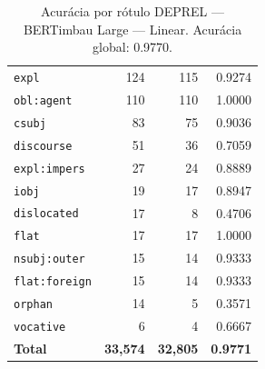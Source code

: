 \begin{table}[ht]
\begin{tabular}{lrrr}
\texttt{expl} & 124 & 115 & 0.9274 \\
\texttt{obl\!:\!agent} & 110 & 110 & 1.0000 \\
\texttt{csubj} & 83 & 75 & 0.9036 \\
\texttt{discourse} & 51 & 36 & 0.7059 \\
\texttt{expl\!:\!impers} & 27 & 24 & 0.8889 \\
\texttt{iobj} & 19 & 17 & 0.8947 \\
\texttt{dislocated} & 17 & 8 & 0.4706 \\
\texttt{flat} & 17 & 17 & 1.0000 \\
\texttt{nsubj\!:\!outer} & 15 & 14 & 0.9333 \\
\texttt{flat\!:\!foreign} & 15 & 14 & 0.9333 \\
\texttt{orphan} & 14 & 5 & 0.3571 \\
\texttt{vocative} & 6 & 4 & 0.6667 \\
\midrule
\textbf{Total} & \textbf{33,574} & \textbf{32,805} & \textbf{0.9771} \\
\bottomrule
\end{tabular}
\caption{Acurácia por rótulo DEPREL — BERTimbau Large — Linear. Acurácia global: 0.9770.}
\label{tab:deprel-acc-predict-test-df-bertimbau-large-linear}
\end{table}

